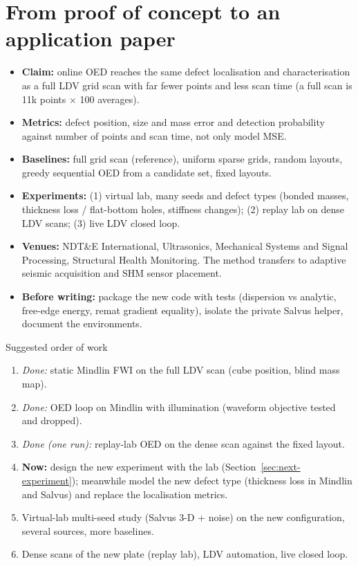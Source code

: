 \documentclass[11pt,a4paper]{article}
\begin{document}
\section{From proof of concept to an application paper}
\begin{itemize}
  \item \textbf{Claim:} online OED reaches the same defect localisation and characterisation as a full LDV grid scan
        with far fewer points and less scan time (a full scan is 11k points $\times$ 100 averages).
  \item \textbf{Metrics:} defect position, size and mass error and detection probability against number of points and
        scan time, not only model MSE.
  \item \textbf{Baselines:} full grid scan (reference), uniform sparse grids, random layouts, greedy sequential OED from
        a candidate set, fixed layouts.
  \item \textbf{Experiments:} (1) virtual lab, many seeds and defect types (bonded masses, thickness loss / flat-bottom
        holes, stiffness changes); (2) replay lab on dense LDV scans; (3) live LDV closed loop.
  \item \textbf{Venues:} NDT\&E International, Ultrasonics, Mechanical Systems and Signal Processing, Structural Health
        Monitoring. The method transfers to adaptive seismic acquisition and SHM sensor placement.
  \item \textbf{Before writing:} package the new code with tests (dispersion vs analytic, free-edge energy, remat
        gradient equality), isolate the private Salvus helper, document the environments.
\end{itemize}

\begin{keybox}{Suggested order of work}
\begin{enumerate}
  \item \emph{Done:} static Mindlin FWI on the full LDV scan (cube position, blind mass map).
  \item \emph{Done:} OED loop on Mindlin with illumination (waveform objective tested and dropped).
  \item \emph{Done (one run):} replay-lab OED on the dense scan against the fixed layout.
  \item \textbf{Now:} design the new experiment with the lab (Section~\ref{sec:next-experiment}); meanwhile model the
        new defect type (thickness loss in Mindlin and Salvus) and replace the localisation metrics.
  \item Virtual-lab multi-seed study (Salvus 3-D + noise) on the new configuration, several sources, more baselines.
  \item Dense scans of the new plate (replay lab), LDV automation, live closed loop.
\end{enumerate}
\end{keybox}
\end{document}
